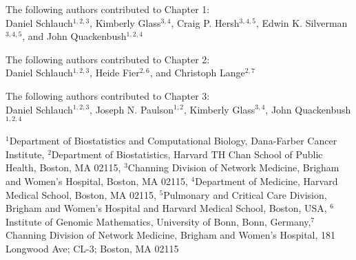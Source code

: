 
\noindent The following authors contributed to Chapter 1: \\
Daniel Schlauch$^{1,2,3}$, Kimberly Glass$^{3,4}$, Craig P. Hersh$^{3,4,5}$, Edwin K. Silverman$^{3,4,5}$, and John Quackenbush$^{1,2,4}$ \\


\vspace{1\baselineskip}

\noindent The following authors contributed to Chapter 2: \\
Daniel Schlauch$^{1,2,3}$, Heide Fier$^{2,6}$, and Christoph Lange$^{2,7}$\\


\vspace{1\baselineskip}


\noindent The following authors contributed to Chapter 3: \\
Daniel Schlauch$^{1,2,3}$, Joseph N. Paulson$^{1,2}$, Kimberly Glass$^{3,4}$, John Quackenbush$^{1,2,4}$\\

\vspace{1\baselineskip}

$^{1}$Department of Biostatistics and Computational Biology, Dana-Farber Cancer Institute, $^{2}$Department of Biostatistics, Harvard TH Chan School of Public Health, Boston, MA 02115, $^{3}$Channing Division of Network Medicine, Brigham and Women's Hospital, Boston, MA 02115, $^{4}$Department of Medicine, Harvard Medical School, Boston, MA 02115, $^{5}$Pulmonary and Critical Care Division, Brigham and Women's Hospital and Harvard Medical School, Boston, USA, $^{6}$Institute of Genomic Mathematics, University of Bonn, Bonn, Germany,$^{7}$Channing Division of Network Medicine,  Brigham and Women's Hospital, 181 Longwood Ave; CL-3; Boston, MA 02115 